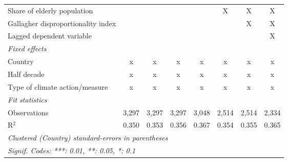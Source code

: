\begin{tabular}{lccccccc}
   Share of elderly population                                    &                &                &                &               & X             & X             & X\\  
   Gallagher disproportionality index                             &                &                &                &               &               & X             & X\\  
   Lagged dependent variable                                      &                &                &                &               &               &               & X\\  
   \emph{Fixed effects}\\
   Country                                                        & x              & x              & x              & x             & x             & x             & x\\  
   Half decade                                                    & x              & x              & x              & x             & x             & x             & x\\  
   Type of climate action/measure                                 & x              & x              & x              & x             & x             & x             & x\\  
   \midrule \emph{Fit statistics}\\
   Observations                                                   & 3,297          & 3,297          & 3,297          & 3,048         & 2,514         & 2,514         & 2,334\\  
   R$^2$                                                          & 0.350          & 0.353          & 0.356          & 0.367         & 0.354         & 0.355         & 0.365\\  
   \midrule
   \multicolumn{8}{l}{\emph{Clustered (Country) standard-errors in parentheses}}\\
   \multicolumn{8}{l}{\emph{Signif. Codes: ***: 0.01, **: 0.05, *: 0.1}}\\
\end{tabular}
\par\endgroup


